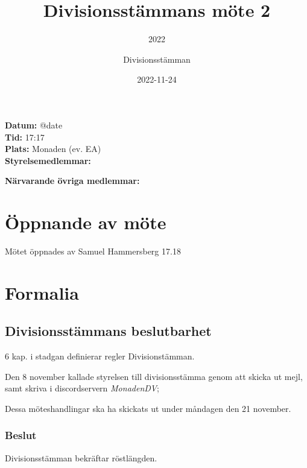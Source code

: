 \documentclass[protokoll]{dvd}
\begin{document}
\title{Divisionsstämmans möte 2}
\subtitle{2022}
\author{Divisionsstämman}
\date{2022-11-24}

\textbf{Datum:} \csname @date\endcsname\\
\textbf{Tid:} 17:17\\
\textbf{Plats:} Monaden (ev. EA)\\
\textbf{Styrelsemedlemmar:}
\begin{närvarande_förtroendevalda}
\end{närvarande_förtroendevalda}

\textbf{Närvarande övriga medlemmar:}
\begin{närvarande_medlemmar}
\end{närvarande_medlemmar}

\section{Öppnande av möte}

Mötet öppnades av Samuel Hammersberg 17.18

\section{Formalia}

\subsection{Divisionsstämmans beslutbarhet}

6 kap. i stadgan definierar regler Divisionstämman.

Den 8 november kallade styrelsen till divisionsstämma genom att skicka ut mejl, samt skriva i discordservern \emph{MonadenDV};

Dessa möteshandlingar ska ha skickats ut under måndagen den 21 november.

\subsubsection*{Beslut}
Divisionsstämman bekräftar röstlängden.
\end{document}
